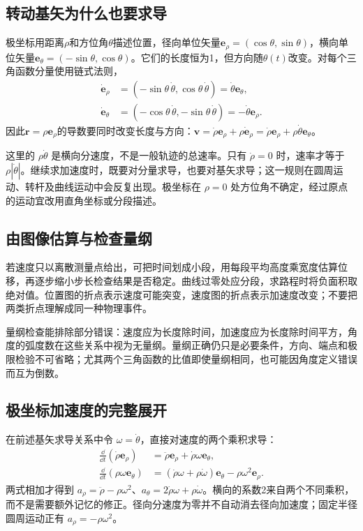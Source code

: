 \subsection{转动基矢为什么也要求导}
极坐标用距离$\rho$和方位角$\theta$描述位置，径向单位矢量$\bm e_\rho=(\cos\theta,\sin\theta)$，横向单位矢量$\bm e_\theta=(-\sin\theta,\cos\theta)$。它们的长度恒为1，但方向随$\theta(t)$改变。对每个三角函数分量使用链式法则，
\begin{align*}
\dot{\bm e}_\rho&=(-\sin\theta\,\dot\theta,\cos\theta\,\dot\theta)
=\dot\theta\bm e_\theta,\\
\dot{\bm e}_\theta&=(-\cos\theta\,\dot\theta,-\sin\theta\,\dot\theta)
=-\dot\theta\bm e_\rho.
\end{align*}
因此$\bm r=\rho\bm e_\rho$的导数要同时改变长度与方向：$\bm v=\dot\rho\bm e_\rho+\rho\dot{\bm e}_\rho=\dot\rho\bm e_\rho+\rho\dot\theta\bm e_\theta$。

这里的 $\rho\dot\theta$ 是横向分速度，不是一般轨迹的总速率。只有 $\dot\rho=0$ 时，速率才等于 $\rho|\dot\theta|$。继续求加速度时，既要对分量求导，也要对基矢求导；这一规则在圆周运动、转杆及曲线运动中会反复出现。极坐标在 $\rho=0$ 处方位角不确定，经过原点的运动宜改用直角坐标或分段描述。
\subsection{由图像估算与检查量纲}
若速度只以离散测量点给出，可把时间划成小段，用每段平均高度乘宽度估算位移，再逐步缩小步长检查结果是否稳定。曲线过零处应分段，求路程时将负面积取绝对值。位置图的折点表示速度可能突变，速度图的折点表示加速度改变；不要把两类折点理解成同一种物理事件。

量纲检查能排除部分错误：速度应为长度除时间，加速度应为长度除时间平方，角度的弧度数在这些关系中视为无量纲。量纲正确仍只是必要条件，方向、端点和极限检验不可省略；尤其两个三角函数的比值即使量纲相同，也可能因角度定义错误而互为倒数。

\subsection{极坐标加速度的完整展开}
在前述基矢求导关系中令 $\omega=\dot\theta$，直接对速度的两个乘积求导：
\begin{align*}
\frac{\dd}{\dd t}(\dot\rho\bm e_\rho)
 &=\ddot\rho\bm e_\rho+\dot\rho\omega\bm e_\theta,\\
\frac{\dd}{\dd t}(\rho\omega\bm e_\theta)
 &=(\dot\rho\omega+\rho\dot\omega)\bm e_\theta-\rho\omega^2\bm e_\rho.
\end{align*}
两式相加才得到 $a_\rho=\ddot\rho-\rho\omega^2$、$a_\theta=2\dot\rho\omega+\rho\dot\omega$。横向的系数2来自两个不同乘积，而不是需要额外记忆的修正。径向分速度为零并不自动消去径向加速度；固定半径圆周运动正有 $a_\rho=-\rho\omega^2$。


